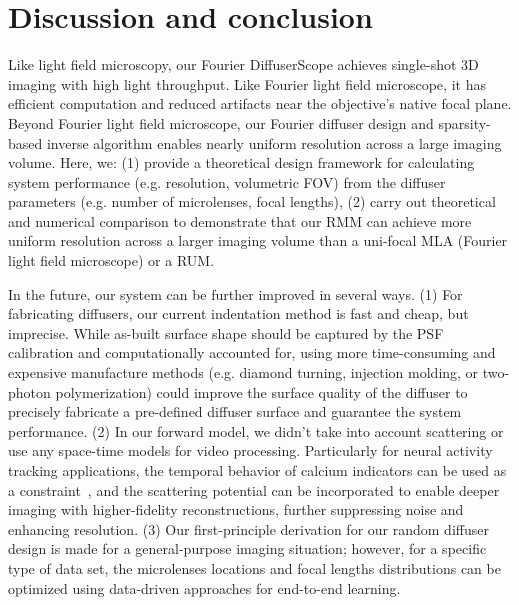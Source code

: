 \documentclass{osa-article}
\begin{document}
\section{Discussion and conclusion}
Like light field microscopy, our Fourier DiffuserScope achieves single-shot 3D imaging with high light throughput. Like Fourier light field microscope, it has efficient computation and reduced artifacts near the objective's native focal plane. Beyond Fourier light field microscope, our Fourier diffuser design and sparsity-based inverse algorithm enables nearly uniform resolution across a large imaging volume. Here, we: (1) provide a theoretical design framework for calculating system performance (e.g. resolution, volumetric FOV) from the diffuser parameters (e.g. number of microlenses, focal lengths), (2) carry out theoretical and numerical comparison to demonstrate that our RMM can achieve more uniform resolution across a larger imaging volume than a uni-focal MLA (Fourier light field microscope) or a RUM.

In the future, our system can be further improved in several ways. (1) For fabricating diffusers, our current indentation method is fast and cheap, but imprecise. While as-built surface shape should be captured by the PSF calibration and computationally accounted for, using more time-consuming and expensive manufacture methods (e.g. diamond turning, injection molding, or two-photon polymerization) could improve the surface quality of the diffuser to precisely fabricate a pre-defined diffuser surface and guarantee the system performance. (2) In our forward model, we didn't take into account scattering or use any space-time models for video processing. Particularly for neural activity tracking applications, the temporal behavior of calcium indicators can be used as a constraint~\cite{paninski2016temporal}, and the scattering potential can be incorporated to enable deeper imaging with higher-fidelity reconstructions, further suppressing noise and enhancing resolution. (3) Our first-principle derivation for our random diffuser design is made for a general-purpose imaging situation; however, for a specific type of data set, the microlenses locations and focal lengths distributions can be optimized using data-driven approaches for end-to-end learning. 

\end{document}
